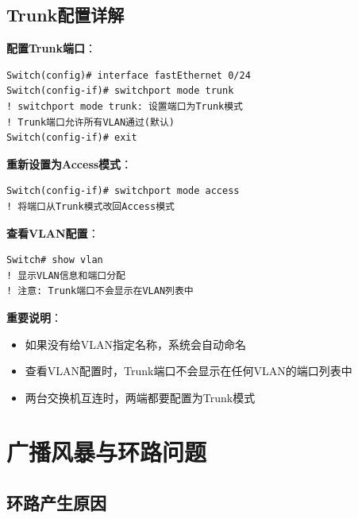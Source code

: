 \documentclass[12pt,a4paper]{ctexart}
\begin{document}
\subsection{Trunk配置详解}

\begin{cmdbox}
\textbf{配置Trunk端口}：
\begin{lstlisting}
Switch(config)# interface fastEthernet 0/24
Switch(config-if)# switchport mode trunk
! switchport mode trunk: 设置端口为Trunk模式
! Trunk端口允许所有VLAN通过(默认)
Switch(config-if)# exit
\end{lstlisting}

\textbf{重新设置为Access模式}：
\begin{lstlisting}
Switch(config-if)# switchport mode access
! 将端口从Trunk模式改回Access模式
\end{lstlisting}

\textbf{查看VLAN配置}：
\begin{lstlisting}
Switch# show vlan
! 显示VLAN信息和端口分配
! 注意: Trunk端口不会显示在VLAN列表中
\end{lstlisting}
\end{cmdbox}

\begin{keybox}
\textbf{重要说明}：
\begin{itemize}[itemsep=0pt]
    \item 如果没有给VLAN指定名称，系统会自动命名
    \item 查看VLAN配置时，Trunk端口不会显示在任何VLAN的端口列表中
    \item 两台交换机互连时，两端都要配置为Trunk模式
\end{itemize}
\end{keybox}

\section{广播风暴与环路问题}

\subsection{环路产生原因}
\end{document}
